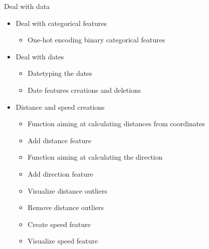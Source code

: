 \documentclass[
 size=14pt,
 paper=smartboard,  %
 mode=present, 		%
 display=slides, 	%
 style=tuliplab,  	%
 pauseslide,
 fleqn,leqno]{powerdot}
\begin{document}
\begin{slide}{Deal with data}
	
\begin{itemize}
\item
Deal with categorical features
\begin{itemize}
	\item
	One-hot encoding binary categorical features
\end{itemize}
\item
Deal with dates
\begin{itemize}
\item
Datetyping the dates
\item
Date features creations and deletions
\end{itemize}
\item
Distance and speed creations
\begin{itemize}
\item
Function aiming at calculating distances from coordinates
\item
Add distance feature
\item
Function aiming at calculating the direction
\item
Add direction feature
\item
Visualize distance outliers
\item
Remove distance outliers
\item
Create speed feature
\item
Visualize speed feature
\end{itemize}
\end{itemize}
\end{slide}
\end{document}
